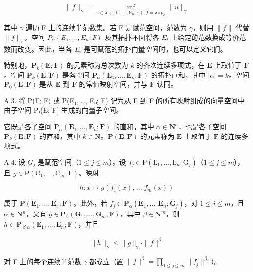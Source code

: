 \[
\| f \| _ {\gamma} = \inf _ {u \in \mathscr {L} _ {\alpha} (\mathrm{E} _ {1}, \dots , \mathrm{E} _ {n}; \mathrm{F}), f = u \circ p _ {\alpha}} \| u \| _ {\gamma}
\]

其中 \(\gamma\) 遍历 F 上的连续半范数集。若 F 是赋范空间，范数为 \(\gamma\)，则用 \(\|f\|\) 代替 \(\|f\|_{\gamma}\)。空间 \(P_{\alpha}(E_{1},\ldots,E_{n};F)\) 及其拓扑不因将各 \(E_{i}\) 上给定的范数换成等价范数而改变。因此，当各 \(E_{i}\) 是可赋范的拓扑向量空间时，也可以定义它们。

特别地，\(\mathbf{P}_{k}(\mathbf{E};\mathbf{F})\) 的元素称为总次数为 \(k\) 的齐次连续多项式，在 \(\mathbf{E}\) 上取值于 \(\mathbf{F}\)。空间 \(\mathbf{P}_{k}(\mathbf{E};\mathbf{F})\) 是各空间 \(\mathbf{P}_{\alpha}(\mathbf{E}_{1},\ldots,\mathbf{E}_{n};\mathbf{F})\) 的拓扑直和，其中 \(|\alpha| = k\)。空间 \(\mathbf{P}_{0}(\mathbf{E};\mathbf{F})\) 是从 \(\mathbf{E}\) 到 \(\mathbf{F}\) 的常值映射空间，并与 \(\mathbf{F}\) 认同。

A.3. 将 P(E; F) 或 P(E₁, \ldots, Eₙ; F) 记为从 E 到 F 的所有映射组成的向量空间中由子空间 Pₖ(E; F) 生成的向量子空间。

它既是各子空间 \(\mathbf{P}_{\alpha}(\mathbf{E}_{1},\ldots,\mathbf{E}_{n};\mathbf{F})\) 的直和，其中 \(\alpha\in\mathbf{N}^{n}\)，也是各子空间 \(\mathbf{P}_{k}(\mathbf{E};\mathbf{F})\) 的直和，其中 \(k\in\mathbf{N}\)。\(\mathbf{P}(\mathbf{E};\mathbf{F})\) 的元素称为 \(\mathbf{E}\) 上取值于 \(\mathbf{F}\) 的连续多项式。

A.4. 设 \(G_{j}\) 是赋范空间（\(1 \leqslant j \leqslant m\)）。设 \(f_{j} \in \mathrm{P}(\mathrm{E}_{1}, \ldots, \mathrm{E}_{n}; \mathrm{G}_{j})\)（\(1 \leqslant j \leqslant m\)），且 \(g \in \mathrm{P}(\mathrm{G}_{1}, \ldots, \mathrm{G}_{m}; \mathrm{F})\)。映射

\[
h: x \mapsto g (f _ {1} (x), \dots , f _ {m} (x))
\]

属于 \(\mathbf{P}(\mathbf{E}_1,\ldots ,\mathbf{E}_n;\mathbf{F})\)。此外，若 \(f_{j}\in \mathbf{P}_{\alpha}(\mathbf{E}_{1},\ldots ,\mathbf{E}_{n};\mathbf{G}_{j})\)，对 \(1\leqslant j\leqslant m\)，且 \(\alpha \in \mathbf{N}^n\)，又有 \(g\in \mathbf{P}_{\beta}(\mathbf{G}_1,\ldots ,\mathbf{G}_m;\mathbf{F})\)，其中 \(\beta \in \mathbf{N}^{m}\)，则 \(h\in \mathbf{P}_{|\beta |\alpha}(\mathbf{E}_1,\ldots ,\mathbf{E}_n;\mathbf{F})\)，并且

\[
\| h \| _ {\gamma} \leqslant \| g \| _ {\gamma} \cdot \| f \| ^ {\beta}
\]

对 F 上的每个连续半范数 \(\gamma\) 都成立（置 \(\| f\|^{\beta} = \prod_{1 \leqslant j \leqslant m} \| f_j \|^{\beta_j}\)）。

